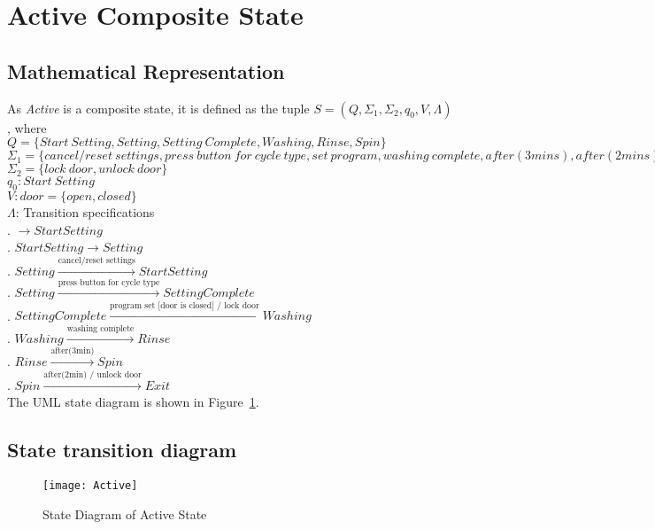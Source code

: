\newpage
\section{Active Composite State}

\subsection{Mathematical Representation}

\noindent As \textit{Active} is a composite state, it is defined as the tuple $S = (Q, \Sigma_1, \Sigma_2, q_0, V, \Lambda)$, where\\

\noindent $Q = \{Start~Setting, Setting, Setting~Complete, Washing, Rinse, Spin\}$\\
\noindent $\Sigma_1 = \{cancel/reset~settings, press~button~for~cycle~type, set~program, washing~complete, after(3 mins), after(2 mins)\}$\\
\noindent $\Sigma_2 = \{lock~door, unlock~door\}$\\
\noindent $q_0: Start~Setting$\\
\noindent $V: door = \{open, closed\}$\\
\noindent $\Lambda$: Transition specifications\\
. $\rightarrow Start Setting$\\
. $Start Setting \rightarrow Setting$\\
. $Setting \xrightarrow {\text {cancel/reset settings}} Start Setting$\\
. $Setting \xrightarrow {\text {press button for cycle type}} Setting Complete$\\
. $Setting Complete \xrightarrow {\text {program set [door is closed] / lock door}} Washing$\\
. $Washing \xrightarrow {\text {washing complete}} Rinse$\\
. $Rinse \xrightarrow {\text {after(3min)}} Spin$\\
. $Spin \xrightarrow {\text {after(2min) / unlock door}} Exit$\\

\noindent The UML state diagram is shown in Figure~\ref{fig:Active}.

\newpage

\subsection{State transition diagram}

\begin{figure}[h!]
	\centering
		\texttt{[image: Active]}
		  \caption{State Diagram of Active State}
  \label{fig:Active}
\end{figure}
